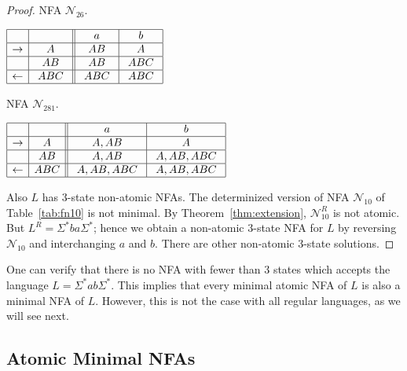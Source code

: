 \documentclass[preprint,12pt]{elsarticle}
\newcommand{\Sig}{\Sigma}
\newcommand{\cN}{{\mathcal N}}
\newcommand{\rev}{R}
\begin{document}
\begin{proof}
\begin{table}[h]
\begin{minipage}[b]{0.45\linewidth}
\caption{NFA $\cN_{26}$.}
\label{tab:fn26}
{\footnotesize
\begin{center}
$
\begin{array}{|c| c||c| c| }    
\hline
& \ \  \ \ 
&\ \ a \ \ &\ \ b \ \ \\
\hline  
\rightarrow &A
& \ AB \ & \ A \ \\
\hline  
 & AB
&  AB  & \  ABC \ \\
\hline  
\leftarrow & \ ABC \
 & \ ABC \ & \ ABC \ \\
\hline  
\end{array}
$
\end{center}}
\end{minipage}
\hspace{0.2cm}
\begin{minipage}[b]{0.45\linewidth}
\caption{NFA $\cN_{281}$.}
\label{tab:fn281}
{\footnotesize
\begin{center}
$
\begin{array}{|c| c||c| c| c|c|}    
\hline
& \ \  \ \ 
&\ \ a \ \ &\ \ b \ \   \\
\hline  
\rightarrow & \ A \
&  \ A,AB \  &  \ A  \   \\
\hline  
 & AB
&  \  A,AB \  & \ A,AB,ABC \ \\
\hline  
\leftarrow & ABC
&   \ A,AB,ABC \  &   A,AB,ABC   \\
\hline  
\end{array}
$
\end{center}}
\end{minipage}
\end{table}


Also $L$ has 3-state non-atomic NFAs.
The determinized version of NFA $\cN_{10}$ of Table~\ref{tab:fn10} is not minimal.
By Theorem~\ref{thm:extension}, $\cN_{10}^\rev$ is not atomic. But $L^R=\Sig^*ba\Sig^*$;
hence we obtain a non-atomic 3-state NFA for $L$ by reversing $\cN_{10}$ and interchanging $a$ and $b$. There are other non-atomic 3-state solutions.
\end{proof}

One can verify that there is no NFA with fewer than 3 states which
accepts the language $L=\Sig^*ab\Sig^*$.
This implies that every minimal atomic NFA of $L$ is also 
a minimal NFA of $L$.
However, this is not the case with all regular languages, as we will see next. 



\subsection{Atomic Minimal NFAs}
 
\end{document}
